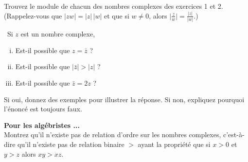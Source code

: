 \begin{prob}
\label{prob01.3} Trouvez le module de chacun des nombres complexes des exercices 1 et 2. (Rappelez-vous que $|z w|=|z|\, |w|$ et que si $w\not=0$, alors $\big|\frac{z}{w}\big|=\frac{|z|}{|w|}$.)

\end{prob}
\begin{prob}
\label{prob01.4}\sov~Si $z$ est un nombre complexe,

\begin{enumerate}[(i)]
	\item Est-il possible que $z={\bar z}$ ?
	\item Est-il possible que $|{\bar z}|>|z|$ ?
	\item Est-il possible que ${\bar z}=2z$ ? 
\end{enumerate}

\medskip Si oui, donnez des exemples pour illustrer la réponse. Si non, expliquez pourquoi l'énoncé est toujours faux.
 \end{prob}






\begin{prob}
\label{prob01.5}
\textbf{Pour les algébristes  ...}\\
Montrez qu'il n'existe pas de relation d'ordre sur les nombres complexes, c'est-à-dire qu'il n'existe pas de relation binaire $>$ ayant la propriété que si $x>0$ et $y>z$ alors $xy>xz$.
 \end{prob}
